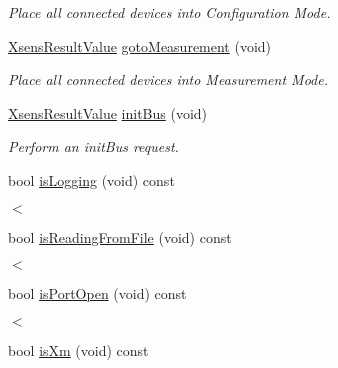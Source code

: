 \begin{DoxyCompactItemize}
\begin{DoxyCompactList}\small\item\em \-Place all connected devices into \-Configuration \-Mode. \end{DoxyCompactList}\item 
\hyperlink{group__enums_ga822a2260a20af524029eef9e9a51ff6f}{\-Xsens\-Result\-Value} \hyperlink{classxsens_1_1Cmt3_a7744ae99e49fc340815fa5ab7284f41f}{goto\-Measurement} (void)
\begin{DoxyCompactList}\small\item\em \-Place all connected devices into \-Measurement \-Mode. \end{DoxyCompactList}\item 
\hyperlink{group__enums_ga822a2260a20af524029eef9e9a51ff6f}{\-Xsens\-Result\-Value} \hyperlink{classxsens_1_1Cmt3_a78d9386e469fd51592458dc9573c41f0}{init\-Bus} (void)
\begin{DoxyCompactList}\small\item\em \-Perform an init\-Bus request. \end{DoxyCompactList}\item 
bool \hyperlink{classxsens_1_1Cmt3_a702976918d210dddc6dedfc5a630587a}{is\-Logging} (void) const 
\begin{DoxyCompactList}\small\item\em $<$ \end{DoxyCompactList}\item 
bool \hyperlink{classxsens_1_1Cmt3_a90036e90730f49b0a55e31ef93cb2300}{is\-Reading\-From\-File} (void) const 
\begin{DoxyCompactList}\small\item\em $<$ \end{DoxyCompactList}\item 
bool \hyperlink{classxsens_1_1Cmt3_a5c5520b44d1fb445baffb7cdaf4826c1}{is\-Port\-Open} (void) const 
\begin{DoxyCompactList}\small\item\em $<$ \end{DoxyCompactList}\item 
\hypertarget{classxsens_1_1Cmt3_aa0f355f17432e8bffa4f0bd8346129c5}{bool \hyperlink{classxsens_1_1Cmt3_aa0f355f17432e8bffa4f0bd8346129c5}{is\-Xm} (void) const }\label{classxsens_1_1Cmt3_aa0f355f17432e8bffa4f0bd8346129c5}


\end{DoxyCompactItemize}
